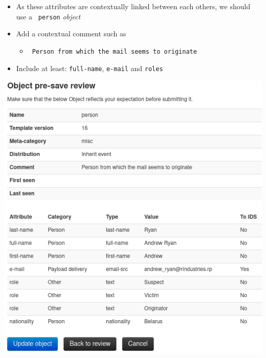 \begin{frame}
    \begin{itemize}
        \item As these attributes are contextually linked between each others, we should use a \texttt{\color{black} person} \textit{object}
        \item Add a contextual comment such as
        \begin{itemize}
            \item \texttt{\color{black} Person from which the mail seems to originate}
        \end{itemize}
        \item Include at least: \texttt{full-name}, \texttt{e-mail} and \texttt{roles}
    \end{itemize}
    \begin{center}
        \includegraphics[width=0.42\linewidth]{pictures/case2/object-person.png}
    \end{center}
\end{frame}

